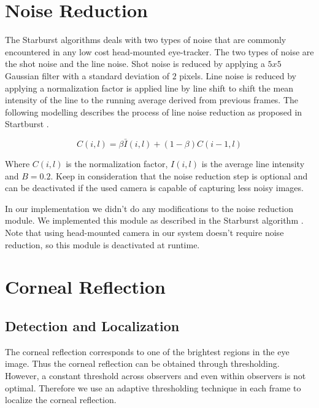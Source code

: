 \documentclass[12pt,fleqn]{book} %
\begin{document}
\section{Noise Reduction}
The Starburst algorithms deals with two types of noise that are commonly encountered in any low cost head-mounted eye-tracker. The two types of noise are the shot noise and the line noise. Shot noise is reduced by applying a $5x5$ Gaussian filter with a standard deviation of $2$ pixels. Line noise is reduced by applying a normalization factor is applied line by line shift to shift the mean intensity of the line to the running average derived from previous frames. The following modelling describes the process of line noise reduction as proposed in Startburst \cite{starburst}.

\begin{dBox}
\begin{equation}
	C(i,l) = \beta \bar I  (i,l) + (1 - \beta) C(i-1, l)
\end{equation}
\end{dBox}

Where $C(i,l)$ is the normalization factor, $I(i,l)$ is the average line intensity and $B = 0.2$. Keep in consideration that the noise reduction step is optional and can be deactivated if the used camera is capable of capturing less noisy images.

In our implementation we didn't do any modifications to the noise reduction module. We implemented this module as described in the Starburst algorithm \cite{starburst}. Note that using head-mounted camera in our system doesn't require noise reduction, so this module is deactivated at runtime.


\section{Corneal Reflection}
\subsection{Detection and Localization}

The corneal reflection corresponds to one of the brightest regions in the eye image. Thus the corneal reflection can be obtained through thresholding. However, a constant threshold across observers and even within observers is not optimal. Therefore we use an adaptive thresholding technique in each frame to localize the corneal reflection. \bigskip
\end{document}
